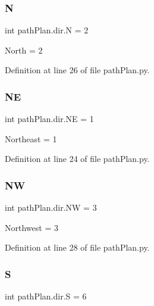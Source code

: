 \subsubsection{\texorpdfstring{N}{N}}
{\footnotesize\ttfamily int path\+Plan.\+dir.\+N = 2\hspace{0.3cm}{\ttfamily [static]}}



North = 2 



Definition at line 26 of file path\+Plan.\+py.

\mbox{\label{classpath_plan_1_1dir_a93c91f045838b0f27107d060557335d6}} 
\subsubsection{\texorpdfstring{NE}{NE}}
{\footnotesize\ttfamily int path\+Plan.\+dir.\+NE = 1\hspace{0.3cm}{\ttfamily [static]}}



Northeast = 1 



Definition at line 24 of file path\+Plan.\+py.

\mbox{\label{classpath_plan_1_1dir_abbaf07a2f6c31300763410df8ff8f222}} 
\subsubsection{\texorpdfstring{NW}{NW}}
{\footnotesize\ttfamily int path\+Plan.\+dir.\+NW = 3\hspace{0.3cm}{\ttfamily [static]}}



Northwest = 3 



Definition at line 28 of file path\+Plan.\+py.

\mbox{\label{classpath_plan_1_1dir_a14b947b877f00f3e35eccb4861881e54}} 
\subsubsection{\texorpdfstring{S}{S}}
{\footnotesize\ttfamily int path\+Plan.\+dir.\+S = 6\hspace{0.3cm}{\ttfamily [static]}}



